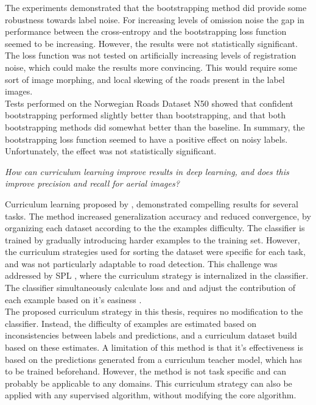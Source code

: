 The experiments demonstrated that the bootstrapping method did provide some robustness towards label noise. For increasing levels of omission noise the gap in performance between the cross-entropy and the bootstrapping loss function seemed to be increasing. However, the results were not statistically significant. The loss function was not tested on artificially increasing levels of registration noise, which could make the results more convincing. This would require some sort of image morphing, and local skewing of the roads present in the label images. \\

Tests performed on the Norwegian Roads Dataset N50 showed that confident bootstrapping performed slightly better than bootstrapping, and that both bootstrapping methods did somewhat better than the baseline. In summary, the bootstrapping loss function seemed to have a positive effect on noisy labels. Unfortunately, the effect was not statistically significant. 

\begin{description}[ style=nextline, leftmargin=1.5em, rightmargin=1.5em]
\item[Research question 2:]{\it How can curriculum learning improve results in deep learning, and does this improve precision and recall for aerial images?}
\end{description}

Curriculum learning proposed by \cite{Bengio_curriculumlearning}, demonstrated compelling results for several tasks. The method increased generalization accuracy and reduced convergence, by organizing each dataset according to the the examples difficulty. The classifier is trained by gradually introducing harder examples to the training set. However, the curriculum strategies used for sorting the dataset were specific for each task, and was not particularly adaptable to road detection. This challenge was addressed by \ac{SPL} \citep{Kumar_self_paced_learning}, where the curriculum strategy is internalized in the classifier. The classifier simultaneously calculate loss and and adjust the contribution of each example based on it's easiness  .\\

The proposed curriculum strategy in this thesis, requires no modification to the classifier. Instead, the difficulty of examples are estimated based on inconsistencies between labels and predictions, and a curriculum dataset build based on these estimates. A limitation of this method is that it's effectiveness is based on the predictions generated from a curriculum teacher model, which has to be trained beforehand. However, the method is not task specific and can probably be applicable to any domains. This curriculum strategy can also be applied with any supervised algorithm, without modifying the core algorithm. \\

